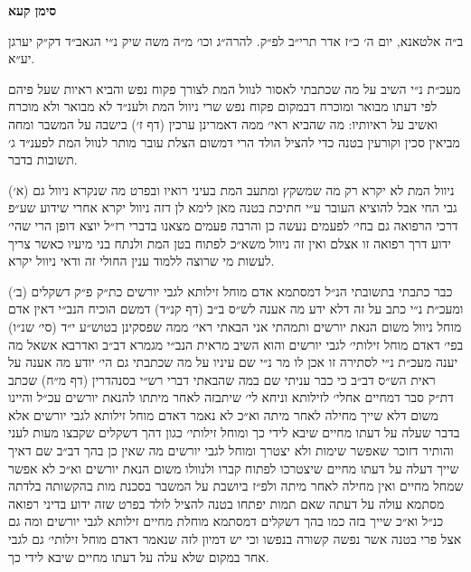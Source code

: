 \documentclass[12pt, openany]{book}
\newcommand{\chapname}{}
\newcommand{\newchap}[1]{
	\addcontentsline{toc}{chapter}{#1}
	\renewcommand{\chapname}{#1}
		\begin{center}
			\textbf{%
\fontsize{16pt}{16pt}\selectfont
				#1}
		\end{center}
}
\begin{document}
\newchap{סימן קעא}
\begin{multicols}{2}
ב״ה אלטאנא, יום ה׳ כ״ז אדר תרי״ב לפ״ק. להרה״ג וכו׳ מ״ה משה שיק נ״י הגאב״ד דק״ק יערגן יע״א.\\\vspace{0pt}

מעכ״ת נ״י השיב על מה שכתבתי לאסור לנוול המת לצורך פקוח נפש והביא ראיות שעל פיהם לפי דעתו מבואר ומוכרח דבמקום פקוח נפש שרי ניוול המת ולענ״ד לא מבואר ולא מוכרח ואשיב על ראיותיו: מה שהביא ראי׳ ממה דאמרינן ערכין (דף ז׳) בישבה על המשבר ומחה מביאין סכין וקורעין בטנה כדי להציל הולד הרי דמשום הצלת עובר מותר לנוול המת לפענ״ד ג׳ תשובות בדבר.\\\vspace{0pt}

(א׳) ניוול המת לא יקרא רק מה שמשקץ ומתעב המת בעיני רואיו ובפרט מה שנקרא ניוול גם גבי החי אבל להוציא העובר ע״י חתיכת בטנה מאן לימא לן דזה ניוול יקרא אחרי שידוע שע״פ דרכי הרפואה גם בחי׳ לפעמים נעשה כן והרבה פעמים מצאנו בדברי רז״ל יוצא דופן הרי שהי׳ ידוע דרך רפואה זו אצלם ואין זה ניוול משא״כ לפתוח בטן המת ולנתח בני מיעיו כאשר צריך לעשות מי שרוצה ללמוד ענין החולי זה ודאי ניוול יקרא.\\\vspace{0pt}

(ב׳) כבר כתבתי בתשובתי הנ״ל דמסתמא אדם מוחל זילותא לגבי יורשים כת״ק פ״ק דשקלים ומעכ״ת נ״י כתב על זה דלא ידע מה אענה לש״ס ב״ב (דף קנ״ד) דמשם הוכיח הנב״י דאין אדם מוחל ניוול משום הנאת יורשים ותמהתי אני הבאתי ראי׳ ממה שפסקינן בטוש״ע י״ד (סי׳ שנ״ו) בפי׳ דאדם מוחל זילותי׳ לגבי יורשים והוא השיב מראית הנב״י מגמרא דב״ב ואדרבא אשאל מה יענה מעכ״ת נ״י לסתירה זו אכן לו מר נ״י שם עיניו על מה שכתבתי גם הי׳ יודע מה אענה על ראית הש״ס דב״ב כי כבר עניתי שם במה שהבאתי דברי רש״י בסנהדרין (דף מ״ח) שכתב דת״ק סבר דמחיים אחלי׳ לזילותא וניחא לי׳ שיתבזה לאחר מיתתו להנאת יורשים עכ״ל והיינו משום דלא שייך מחילה לאחר מיתה וא״כ לא נאמר דאדם מוחל זילותא לגבי יורשים אלא בדבר שעלה על דעתו מחיים שיבא לידי כך ומוחל זילותי׳ כגון דהך דשקלים שקבצו מעות לעני והותיר דזוכר שאפשר שימות ולא יצטרך ומוחל לגבי יורשים מה שאין כן בהך דב״ב שם דאיך שייך דעלה על דעתו מחיים שיצטרכו לפתוח קברו ולנוולו משום הנאת יורשים וא״כ לא אפשר שמחל מחיים ואין מחילה לאחר מיתה ולפ״ז ביושבת על המשבר בסכנת מות בהקשותה בלדתה מסתמא עולה על דעתה שאם תמות יפתחו בטנה להציל לולד בפרט שזה ידוע בדיני רפואה כנ״ל וא״כ שייך בזה כמו בהך דשקלים דמסתמא מוחלת מחיים זילותא לגבי יורשים ומה גם אצל פרי בטנה אשר נפשה קשורה בנפשו וכי יש דמיון לזה שנאמר דאדם מוחל זילותי׳ גם לגבי אחר במקום שלא עלה על דעתו מחיים שיבא לידי כך.\\\vspace{0pt}


\end{multicols}
\end{document}
